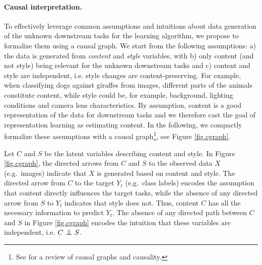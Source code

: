 \documentclass{article}
\newcommand{\bigCI}{\mathrel{\text{\scalebox{1.07}{$\perp\mkern-10mu\perp$}}}}
\begin{document}
\paragraph{Causal interpretation.} To effectively leverage common assumptions and intuitions about data generation of the unknown downstream tasks for the learning algorithm, we propose to formalize them using a causal graph. 
We start from the following assumptions: a) the data is generated from \emph{content} and \emph{style} variables, with b) only content (and not style) being relevant for the unknown downstream tasks and c) content and style are independent, i.e. style changes are content-preserving.
For example, when classifying dogs against giraffes from images, different parts of the animals constitute content, while style could be, for example, background, lighting conditions and camera lens characteristics.
By assumption, content is a good representation of the data for downstream tasks and we therefore cast the goal of representation learning as estimating content.
In the following, we compactly formalize these assumptions with a causal graph\footnote{See \citep{peters2017elements} for a review of causal graphs and causality.}, see Figure \ref{fig.cgraph}.

Let $C$ and $S$ be the latent variables describing content and style. 
In Figure \ref{fig.cgraph}, the directed arrows from $C$ and $S$ to the observed data $X$ (e.g.\ images) indicate that $X$ is generated based on content and style. 
The directed arrow from $C$ to the target $Y_{t}$ (e.g.\ class labels) encodes the assumption that content directly influences the target tasks, while the absence of any directed arrow from $S$ to $Y_{t}$ indicates that style does not. 
Thus, content $C$ has all the necessary information to predict $Y_{t}$.
The absence of any directed path between $C$ and $S$ in Figure \ref{fig.cgraph} encodes the intuition that these variables are independent, i.e. $C \bigCI S$.
\end{document}
